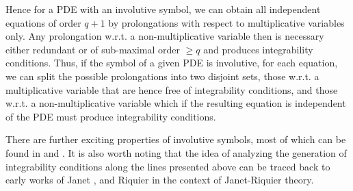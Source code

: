 Hence for a PDE with an involutive symbol, we can obtain all independent equations of order $q+1$ by prolongations with respect to multiplicative variables only. Any prolongation w.r.t. a non-multiplicative variable then is necessary either redundant or of sub-maximal order $\geq q$ and produces integrability conditions. 
Thus, if the symbol of a given PDE is involutive, for each equation, we can split the possible prolongations into two disjoint sets, those w.r.t. a multiplicative variable that are hence free of integrability conditions, and those w.r.t. a non-multiplicative variable which if the resulting equation is independent of the PDE must produce integrability conditions.

There are further exciting properties of involutive symbols, most of which can be found in \cite{seiler2009involution} and \cite{seiler2009involution}. It is also worth noting that the idea of analyzing the generation of integrability conditions along the lines presented above can be traced back to early works of Janet \cite{janet1920systemes}, \cite{MSM_1927__21__1_0} and Riquier \cite{Riquier} in the context of Janet-Riquier theory.

